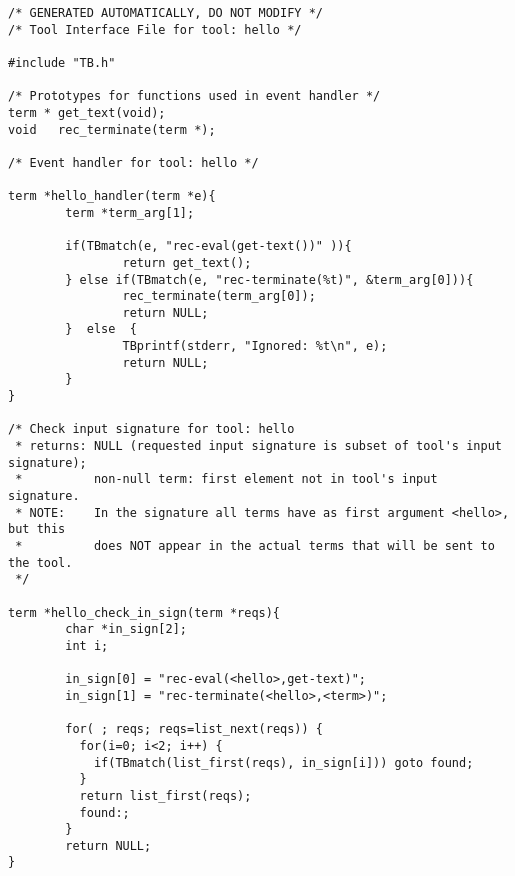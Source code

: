 \begin{verbatim}
/* GENERATED AUTOMATICALLY, DO NOT MODIFY */
/* Tool Interface File for tool: hello */

#include "TB.h"

/* Prototypes for functions used in event handler */
term * get_text(void);
void   rec_terminate(term *);

/* Event handler for tool: hello */

term *hello_handler(term *e){
        term *term_arg[1];

        if(TBmatch(e, "rec-eval(get-text())" )){
                return get_text();
        } else if(TBmatch(e, "rec-terminate(%t)", &term_arg[0])){
                rec_terminate(term_arg[0]);
                return NULL;
        }  else  {
                TBprintf(stderr, "Ignored: %t\n", e);
                return NULL;
        }
}

/* Check input signature for tool: hello
 * returns: NULL (requested input signature is subset of tool's input signature);
 *          non-null term: first element not in tool's input signature.
 * NOTE:    In the signature all terms have as first argument <hello>, but this
 *          does NOT appear in the actual terms that will be sent to the tool.
 */

term *hello_check_in_sign(term *reqs){
        char *in_sign[2];
        int i;

        in_sign[0] = "rec-eval(<hello>,get-text)";
        in_sign[1] = "rec-terminate(<hello>,<term>)";

        for( ; reqs; reqs=list_next(reqs)) {
          for(i=0; i<2; i++) {
            if(TBmatch(list_first(reqs), in_sign[i])) goto found;
          }
          return list_first(reqs);
          found:;
        }
        return NULL;
}
\end{verbatim}

